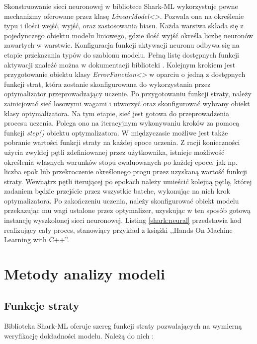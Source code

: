 Skonstruowanie sieci neuronowej w bibliotece Shark-ML wykorzystuje pewne mechanizmy oferowane przez klasę \textit{LinearModel<>}. Pozwala ona na określenie typu i ilości wejść, wyjść, oraz zastosowania biasu. Każda warstwa składa się z pojedynczego obiektu modelu liniowego, gdzie ilość wyjść określa liczbę neuronów zawartych w warstwie. Konfiguracja funkcji aktywacji neuronu odbywa się na etapie przekazania typów do szablonu modelu. Pełną listę dostępnych funkcji aktywacji znaleźć można w dokumentacji biblioteki \cite{shark:activation}. Kolejnym krokiem jest przygotowanie obiektu klasy \textit{ErrorFunction<>} w oparciu o jedną z dostępnych funkcji strat, która zostanie skonfigurowana do wykorzystania przez optymalizator przeprowadzający uczenie. Po przygotowaniu funkcji straty, należy zainicjować sieć losowymi wagami i utworzyć oraz skonfigurować wybrany obiekt klasy optymalizatora. Na tym etapie, sieć jest gotowa do przeprowadzenia procesu uczenia. Polega ono na iteracyjnym wykonywaniu kroków za pomocą funkcji \textit{step()} obiektu optymalizatora. W międzyczasie możliwe jest także pobranie wartości funkcji straty na każdej epoce uczenia. Z racji konieczności użycia zwykłej pętli zdefiniowanej przez użytkownika, istnieje możliwość określenia własnych warunków stopu ewaluowanych po każdej epoce, jak np. liczba epok lub przekroczenie określonego progu przez uzyskaną wartość funkcji straty. Wewnątrz pętli iterującej po epokach należy umieścić kolejną pętlę, której zadaniem będzie przejście przez wszystkie batche, wykonując na nich krok optymalizatora. Po zakończeniu uczenia, należy skonfigurować obiekt modelu przekazując mu wagi ustalone przez optymalizer, uzyskując w ten sposób gotową instancję wyszkolonej sieci neuronowej. Listing \ref{shark:neural} przedstawia kod realizujący cały proces, stanowiący przykład z książki ,,Hands On Machine Learning with C++''.


\section{Metody analizy modeli}

\subsection{Funkcje straty}

Biblioteka Shark-ML oferuje szereg funkcji straty pozwalających na wymierną weryfikację dokładności modelu. Należą do nich \cite{shark:loss}:

